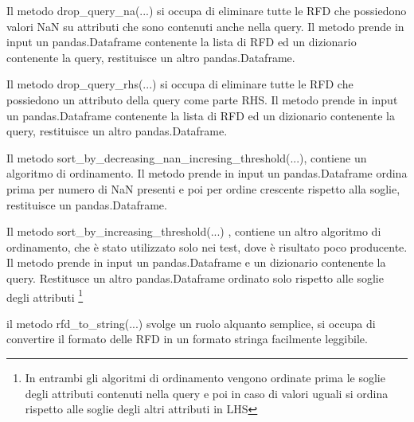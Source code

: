 Il metodo drop{\_}query{\_}na(...) si occupa di eliminare tutte le RFD che possiedono valori NaN su attributi che sono contenuti anche nella query. Il metodo prende in input un pandas.Dataframe contenente la lista di RFD ed un dizionario contenente la query, restituisce un altro pandas.Dataframe.

Il metodo drop{\_}query{\_}rhs(...) si occupa di eliminare tutte le RFD che possiedono un attributo della query come parte RHS. Il metodo prende in input un pandas.Dataframe contenente la lista di RFD ed un dizionario contenente la query, restituisce un altro pandas.Dataframe.

Il metodo sort{\_}by{\_}decreasing{\_}nan{\_}incresing{\_}threshold(...), contiene un algoritmo di ordinamento. Il metodo prende in input un pandas.Dataframe ordina prima per numero di NaN presenti e poi per ordine crescente rispetto alla soglie, restituisce un pandas.Dataframe.

Il metodo sort{\_}by{\_}increasing{\_}threshold(...) , contiene un altro algoritmo di ordinamento, che è stato utilizzato solo nei test, dove è risultato poco producente. Il metodo prende in input un pandas.Dataframe e un dizionario contenente la query. Restitusce un altro pandas.Dataframe ordinato solo rispetto alle soglie degli attributi \footnote{In entrambi gli algoritmi di ordinamento vengono ordinate prima le soglie degli attributi contenuti nella query e poi in caso di valori uguali si ordina rispetto alle soglie degli altri attributi in LHS}

il metodo rfd{\_}to{\_}string(...) svolge un ruolo alquanto semplice, si occupa di convertire il formato delle RFD in un formato stringa facilmente leggibile.